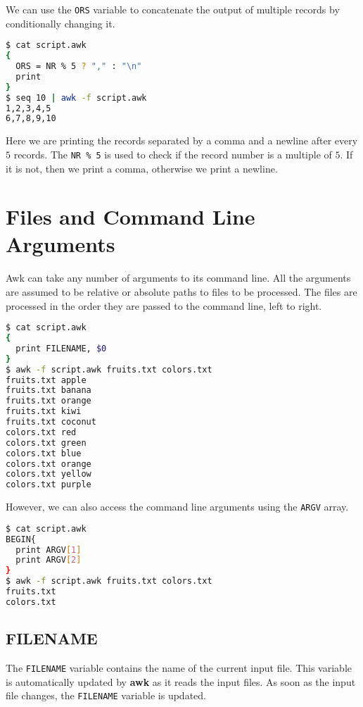 We can use the \lstinline|ORS| variable to concatenate the output of multiple records by conditionally changing it.

\begin{lstlisting}[language=bash]
$ cat script.awk
{
  ORS = NR % 5 ? "," : "\n"
  print
}
$ seq 10 | awk -f script.awk
1,2,3,4,5
6,7,8,9,10
\end{lstlisting}

Here we are printing the records separated by a comma and a newline after every $5$ records.
The \lstinline|NR % 5| is used to check if the record number is a multiple of $5$.
If it is not, then we print a comma, otherwise we print a newline.

\section{Files and Command Line Arguments}

Awk can take any number of arguments to its command line.
All the arguments are assumed to be relative or absolute paths to files to be processed.
The files are processed in the order they are passed to the command line, left to right.

\begin{lstlisting}[language=bash]
$ cat script.awk
{
  print FILENAME, $0
}
$ awk -f script.awk fruits.txt colors.txt
fruits.txt apple
fruits.txt banana
fruits.txt orange
fruits.txt kiwi
fruits.txt coconut
colors.txt red
colors.txt green
colors.txt blue
colors.txt orange
colors.txt yellow
colors.txt purple
\end{lstlisting}

However, we can also access the command line arguments using the \lstinline|ARGV| array.

\begin{lstlisting}[language=bash]
$ cat script.awk
BEGIN{
  print ARGV[1]
  print ARGV[2]
}
$ awk -f script.awk fruits.txt colors.txt
fruits.txt
colors.txt
\end{lstlisting}

\subsection{FILENAME}

The \lstinline|FILENAME| variable contains the name of the current input file.
This variable is automatically updated by \textbf{awk} as it reads the input files.
As soon as the input file changes, the \lstinline|FILENAME| variable is updated.

